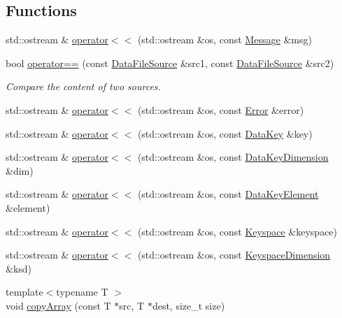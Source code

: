 \subsection*{Functions}
\begin{DoxyCompactItemize}
\item 
std::ostream \& \hyperlink{namespaceBUSBOY_aa34993c405d596f786e60c5e28227ee0}{operator$<$$<$} (std::ostream \&os, const \hyperlink{classBUSBOY_1_1Message}{Message} \&msg)
\item 
bool \hyperlink{namespaceBUSBOY_a1a5eaeb88615f0cf63f6d095afa22001}{operator==} (const \hyperlink{classBUSBOY_1_1DataFileSource}{DataFileSource} \&src1, const \hyperlink{classBUSBOY_1_1DataFileSource}{DataFileSource} \&src2)
\begin{DoxyCompactList}\small\item\em Compare the content of two sources. \item\end{DoxyCompactList}\item 
std::ostream \& \hyperlink{namespaceBUSBOY_abf725420838926e6e0be40f6be286e1e}{operator$<$$<$} (std::ostream \&os, const \hyperlink{classBUSBOY_1_1Error}{Error} \&error)
\item 
std::ostream \& \hyperlink{namespaceBUSBOY_a37db6513c53aae204080d673cf0fe9ac}{operator$<$$<$} (std::ostream \&os, const \hyperlink{classBUSBOY_1_1DataKey}{DataKey} \&key)
\item 
std::ostream \& \hyperlink{namespaceBUSBOY_aef9a872b4e1de144c66c31eebe6cb391}{operator$<$$<$} (std::ostream \&os, const \hyperlink{classBUSBOY_1_1DataKeyDimension}{DataKeyDimension} \&dim)
\item 
std::ostream \& \hyperlink{namespaceBUSBOY_ab363c0d7faea2289510d7538af45dbf4}{operator$<$$<$} (std::ostream \&os, const \hyperlink{classBUSBOY_1_1DataKeyElement}{DataKeyElement} \&element)
\item 
std::ostream \& \hyperlink{namespaceBUSBOY_a2fe378367a91118bd460bb2949833f07}{operator$<$$<$} (std::ostream \&os, const \hyperlink{classBUSBOY_1_1Keyspace}{Keyspace} \&keyspace)
\item 
std::ostream \& \hyperlink{namespaceBUSBOY_a6c78735918c3de429c845f19928761ee}{operator$<$$<$} (std::ostream \&os, const \hyperlink{classBUSBOY_1_1KeyspaceDimension}{KeyspaceDimension} \&ksd)
\item 
{\footnotesize template$<$typename T $>$ }\\void \hyperlink{namespaceBUSBOY_af886065748417a14b9702e52d3db9773}{copyArray} (const T $\ast$src, T $\ast$dest, size\_\-t size)

\end{DoxyCompactItemize}
